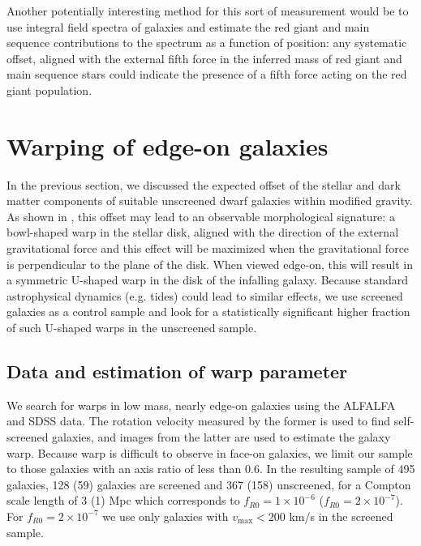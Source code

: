 \documentclass[useAMS,usenatbib,twocolumn]{mn2e}
\begin{document}
Another potentially interesting method 
for this sort of measurement would be to use integral field
spectra of galaxies and estimate the red giant and main sequence contributions
to the spectrum as a function of position: any systematic offset, aligned with
the external fifth force in the inferred mass of red giant and main sequence
stars could indicate the presence of a fifth force acting on the red giant
population.




\section{Warping of edge-on galaxies}
\label{sec:warp}

In the previous section, we discussed the expected offset of the stellar
and dark matter components of suitable unscreened dwarf galaxies within
modified gravity.  As shown in \citet{bhuvjake2011}, this offset may lead
to an observable morphological signature: a bowl-shaped warp in the stellar
disk, aligned with the direction of the external gravitational force and this
effect will be maximized when the gravitational
force is perpendicular to the plane of the disk. When viewed edge-on,
this will result in a symmetric U-shaped warp in the disk of the infalling
galaxy.  Because standard astrophysical dynamics (e.g. tides) could lead to
similar effects, we use screened galaxies as a control sample and look for
a statistically significant higher fraction of such U-shaped warps in the
unscreened sample.

\subsection{Data and estimation of warp parameter}
We search for warps in low mass, nearly edge-on galaxies using the
ALFALFA and SDSS data. The rotation velocity measured by the former is used to
find self-screened galaxies, and images from the latter are
used to estimate the galaxy warp.
Because warp is difficult to observe in face-on
galaxies, we limit our sample to those galaxies with an axis ratio
of less than 0.6. In the resulting sample of 495 galaxies, 128 (59) 
galaxies are screened and 367 (158) unscreened, for a Compton scale length of 3
(1) Mpc which corresponds to $f_{R0}=1 \times 10^{-6}$ ($f_{R0}=2 \times
10^{-7}$). For $f_{R0}=2 \times 10^{-7}$ we use only galaxies with
$v_\mathrm{max} < 200$ km/s in the screened sample.
\end{document}

